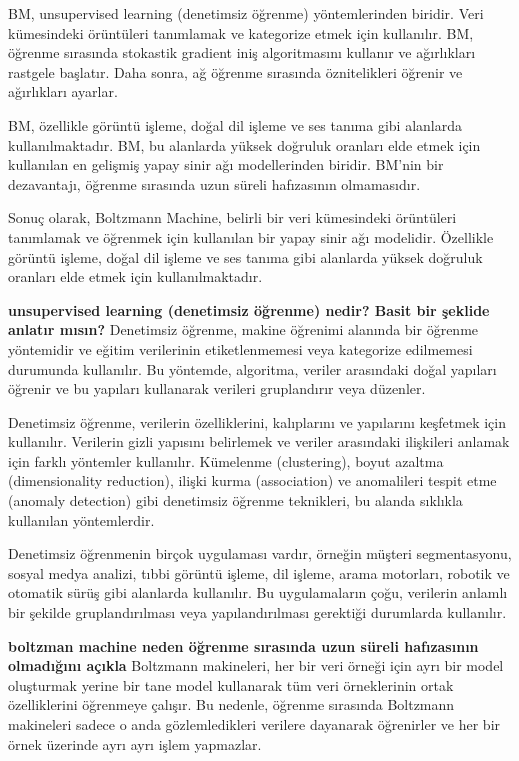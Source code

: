 \documentclass[11pt]{article}
\begin{document}
BM, unsupervised learning (denetimsiz öğrenme) yöntemlerinden biridir. Veri kümesindeki örüntüleri tanımlamak ve kategorize etmek için kullanılır. BM, öğrenme sırasında stokastik gradient iniş algoritmasını kullanır ve ağırlıkları rastgele başlatır. Daha sonra, ağ öğrenme sırasında öznitelikleri öğrenir ve ağırlıkları ayarlar.

BM, özellikle görüntü işleme, doğal dil işleme ve ses tanıma gibi alanlarda kullanılmaktadır. BM, bu alanlarda yüksek doğruluk oranları elde etmek için kullanılan en gelişmiş yapay sinir ağı modellerinden biridir. BM'nin bir dezavantajı, öğrenme sırasında uzun süreli hafızasının olmamasıdır.

Sonuç olarak, Boltzmann Machine, belirli bir veri kümesindeki örüntüleri tanımlamak ve öğrenmek için kullanılan bir yapay sinir ağı modelidir. Özellikle görüntü işleme, doğal dil işleme ve ses tanıma gibi alanlarda yüksek doğruluk oranları elde etmek için kullanılmaktadır.

 \textbf{unsupervised learning (denetimsiz öğrenme) nedir? Basit bir şeklide anlatır mısın?}
Denetimsiz öğrenme, makine öğrenimi alanında bir öğrenme yöntemidir ve eğitim verilerinin etiketlenmemesi veya kategorize edilmemesi durumunda kullanılır. Bu yöntemde, algoritma, veriler arasındaki doğal yapıları öğrenir ve bu yapıları kullanarak verileri gruplandırır veya düzenler.

Denetimsiz öğrenme, verilerin özelliklerini, kalıplarını ve yapılarını keşfetmek için kullanılır. Verilerin gizli yapısını belirlemek ve veriler arasındaki ilişkileri anlamak için farklı yöntemler kullanılır. Kümelenme (clustering), boyut azaltma (dimensionality reduction), ilişki kurma (association) ve anomalileri tespit etme (anomaly detection) gibi denetimsiz öğrenme teknikleri, bu alanda sıklıkla kullanılan yöntemlerdir.

Denetimsiz öğrenmenin birçok uygulaması vardır, örneğin müşteri segmentasyonu, sosyal medya analizi, tıbbi görüntü işleme, dil işleme, arama motorları, robotik ve otomatik sürüş gibi alanlarda kullanılır. Bu uygulamaların çoğu, verilerin anlamlı bir şekilde gruplandırılması veya yapılandırılması gerektiği durumlarda kullanılır.

\textbf{boltzman machine neden öğrenme sırasında uzun süreli hafızasının olmadığını açıkla}
Boltzmann makineleri, her bir veri örneği için ayrı bir model oluşturmak yerine bir tane model kullanarak tüm veri örneklerinin ortak özelliklerini öğrenmeye çalışır. Bu nedenle, öğrenme sırasında Boltzmann makineleri sadece o anda gözlemledikleri verilere dayanarak öğrenirler ve her bir örnek üzerinde ayrı ayrı işlem yapmazlar.
\end{document}
